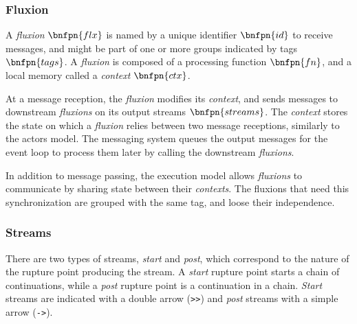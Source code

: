 

\subsubsection{Fluxion}

A \textit{fluxion} $\bnfpn{flx}$ is named by a unique identifier $\bnfpn{id}$ to receive messages, and might be part of one or more groups indicated by tags $\bnfpn{tags}$.
A \textit{fluxion} is composed of a processing function $\bnfpn{fn}$, and a local memory called a \textit{context} $\bnfpn{ctx}$.

At a message reception, the \textit{fluxion} modifies its \textit{context}, and sends messages to downstream \textit{fluxions} on its output streams $\bnfpn{streams}$.
The \textit{context} stores the state on which a \textit{fluxion} relies between two message receptions, similarly to the actors model.
The messaging system queues the output messages for the event loop to process them later by calling the downstream \textit{fluxions}.


In addition to message passing, the execution model allows \textit{fluxions} to communicate by sharing state between their \textit{contexts}.
The fluxions that need this synchronization are grouped with the same tag, and loose their independence.

\subsubsection{Streams}

There are two types of streams, \textit{start} and \textit{post}, which correspond to the nature of the rupture point producing the stream.
A \textit{start} rupture point starts a chain of continuations, while a \textit{post} rupture point is a continuation in a chain.
\textit{Start} streams are indicated with a double arrow (\texttt{>}\texttt{>}) and \textit{post} streams with a simple arrow (\texttt{->}).